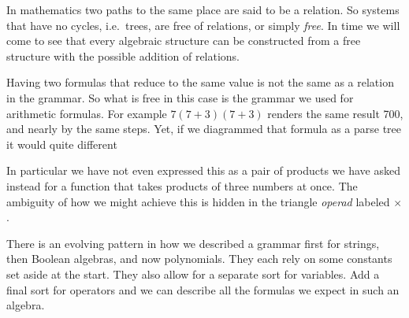 
In mathematics two paths to the same place are said to be a relation.  So systems that have no cycles, i.e.\ trees, are 
free of relations, or simply \emph{free}.  In time we will come to see 
that every algebraic structure can be constructed from a free 
structure with the possible addition of relations.

\begin{remark}
    Having two formulas that reduce to the same value is not the same 
as a relation in the grammar.  So what is free in this case 
is the grammar we used for arithmetic formulas.  
For example $7(7+3)(7+3)$ renders the same result 700, and nearly 
by the same steps.  Yet, if we diagrammed that formula as a
parse tree it would quite different
\begin{center}
\end{center}    
In particular we have not even expressed this as a pair of products 
we have asked instead for a function that takes products of three 
numbers at once.  The ambiguity of how we might achieve this is hidden in the 
triangle \emph{operad} labeled $\times$.
\end{remark}


There is an evolving pattern in how we described a grammar first for strings, 
then Boolean algebras, and now polynomials.  They each rely on some 
constants set aside at the start.  They also allow for a separate sort for
variables.  Add a final sort for operators and we can describe all the formulas 
we expect in such an algebra.
